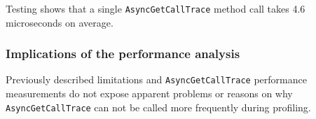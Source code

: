 \documentclass[..thesis.tex]{subfiles}
\begin{document}
Testing shows that a single \texttt{AsyncGetCallTrace} method call takes 4.6 microseconds on average.

\subsubsection{Implications of the performance analysis}
Previously described limitations and \texttt{AsyncGetCallTrace} performance measurements do not expose apparent problems or reasons on why \texttt{AsyncGetCallTrace} can not be called more frequently during profiling.


\end{document}
